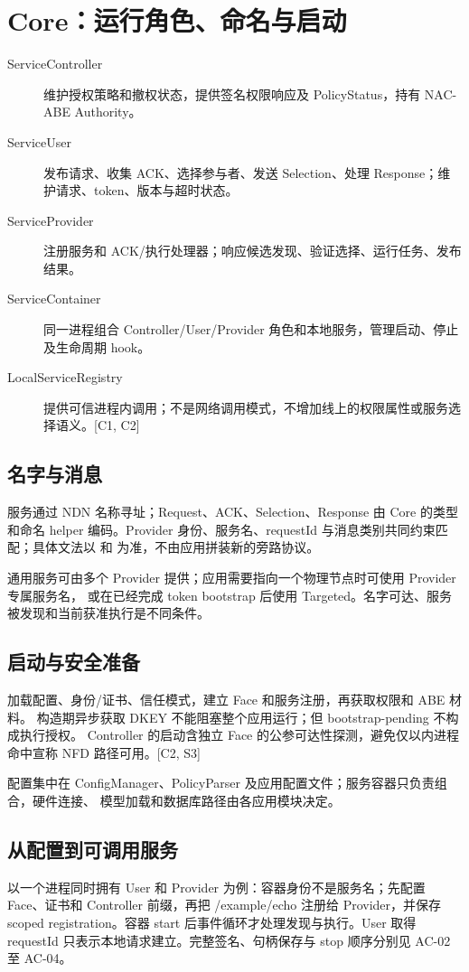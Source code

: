 \section{Core：运行角色、命名与启动}
\begin{description}
\item[ServiceController] 维护授权策略和撤权状态，提供签名权限响应及 PolicyStatus，持有 NAC-ABE Authority。
\item[ServiceUser] 发布请求、收集 ACK、选择参与者、发送 Selection、处理 Response；维护请求、token、版本与超时状态。
\item[ServiceProvider] 注册服务和 ACK/执行处理器；响应候选发现、验证选择、运行任务、发布结果。
\item[ServiceContainer] 同一进程组合 Controller/User/Provider 角色和本地服务，管理启动、停止及生命周期 hook。
\item[LocalServiceRegistry] 提供可信进程内调用；不是网络调用模式，不增加线上的权限属性或服务选择语义。[C1, C2]
\end{description}

\subsection{名字与消息}
服务通过 NDN 名称寻址；Request、ACK、Selection、Response 由 Core 的类型和命名 helper
编码。Provider 身份、服务名、requestId 与消息类别共同约束匹配；具体文法以
 和  为准，不由应用拼装新的旁路协议。

通用服务可由多个 Provider 提供；应用需要指向一个物理节点时可使用 Provider 专属服务名，
或在已经完成 token bootstrap 后使用 Targeted。名字可达、服务被发现和当前获准执行是不同条件。

\subsection{启动与安全准备}
加载配置、身份/证书、信任模式，建立 Face 和服务注册，再获取权限和 ABE 材料。
构造期异步获取 DKEY 不能阻塞整个应用运行；但 bootstrap-pending 不构成执行授权。
Controller 的启动含独立 Face 的公参可达性探测，避免仅以内进程命中宣称 NFD 路径可用。[C2, S3]

配置集中在 ConfigManager、PolicyParser 及应用配置文件；服务容器只负责组合，硬件连接、
模型加载和数据库路径由各应用模块决定。


\subsection{从配置到可调用服务}
以一个进程同时拥有 User 和 Provider 为例：容器身份不是服务名；先配置 Face、证书和 Controller 前缀，再把 /example/echo 注册给 Provider，并保存 scoped registration。容器 start 后事件循环才处理发现与执行。User 取得 requestId 只表示本地请求建立。完整签名、句柄保存与 stop 顺序分别见 AC-02 至 AC-04。

